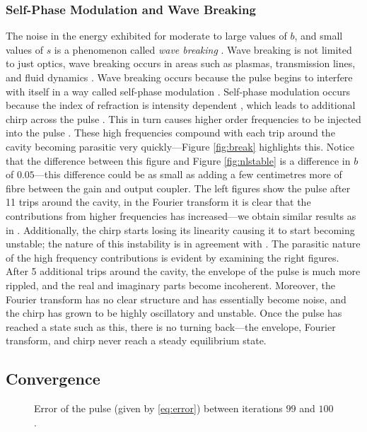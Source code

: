 \subsubsection{Self-Phase Modulation and Wave Breaking}

The noise in the energy exhibited for moderate to large values of $b$, and small values of $s$ is a phenomenon called \emph{wave breaking} \cite{agrawal2013, anderson, finot, rothenberg, tomlinson}. Wave breaking is not limited to just optics, wave breaking occurs in areas such as plasmas, transmission lines, and fluid dynamics \cite{rothenberg}. Wave breaking occurs because the pulse begins to interfere with itself in a way called self-phase modulation \cite{agrawal2002, agrawal2013, becker}. Self-phase modulation occurs because the index of refraction is intensity dependent \cite{agrawal2002, becker, rothenberg, silfvast}, which leads to additional chirp across the pulse \cite{agrawal2013, anderson, rothenberg, silfvast}. This in turn causes higher order frequencies to be injected into the pulse \cite{agrawal2013, anderson}. These high frequencies compound with each trip around the cavity becoming parasitic very quickly---Figure \ref{fig:break} highlights this. Notice that the difference between this figure and Figure \ref{fig:nlstable} is a difference in $b$ of $0.05$---this difference could be as small as adding a few centimetres more of fibre between the gain and output coupler. The left figures show the pulse after 11 trips around the cavity, in the Fourier transform it is clear that the contributions from higher frequencies has increased---we obtain similar results as in \cite{anderson, rothenberg}. Additionally, the chirp starts losing its linearity causing it to start becoming unstable; the nature of this instability is in agreement with \cite{anderson, rothenberg}. The parasitic nature of the high frequency contributions is evident by examining the right figures. After 5 additional trips around the cavity, the envelope of the pulse is much more rippled, and the real and imaginary parts become incoherent. Moreover, the Fourier transform has no clear structure and has essentially become noise, and the chirp has grown to be highly oscillatory and unstable. Once the pulse has reached a state such as this, there is no turning back---the envelope, Fourier transform, and chirp never reach a steady equilibrium state. \\

\subsection{Convergence}
\begin{figure}[tbp]

\caption[Error of the pulse.]{Error of the pulse (given by \eqref{eq:error}) between iterations $99$ and $100$.}
\label{fig:error}
\end{figure}

